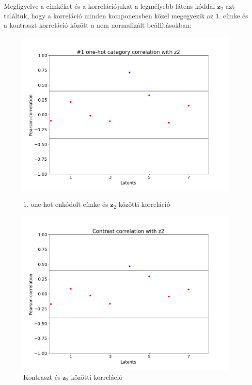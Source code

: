 \documentclass[12pt, english]{article}
\begin{document}
\par Megfigyelve a címkéket és a korrelációjukat a legmélyebb látens kóddal $\bm{z}_{2}$ azt találtuk, hogy a korreláció minden komponensben közel megegyezik az $1.$ címke és a kontraszt korreláció között a nem normalizált beállításokban:

\vspace{4mm}

\begin{figure}[H]
\begin{minipage}{0.5\linewidth}
    \centering
    \includegraphics[width=.72\linewidth]{label-contrast-corr/cat-1-to-z2-corr.png} 
    \caption{$1.$ one-hot enkódolt címke és $\bm{z}_{2}$ közötti korreláció} 
    \label{fig:label-contrast-corr-1}
\end{minipage}%
\begin{minipage}{0.5\linewidth}
    \centering
    \includegraphics[width=.72\linewidth]{label-contrast-corr/contrast-to-z2-corr.png} 
    \caption{Kontraszt és $\bm{z}_{2}$ közötti korreláció} 
    \label{fig:label-contrast-corr-2}
\end{minipage} 
\end{figure}
\end{document}
